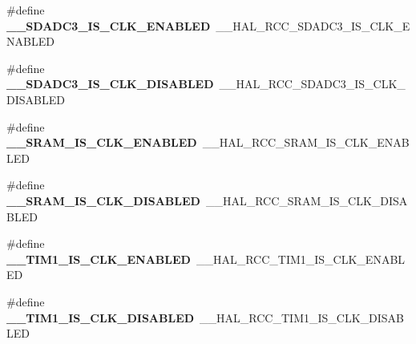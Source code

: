 \begin{DoxyCompactItemize}
\item 
\#define {\bfseries \+\_\+\+\_\+\+S\+D\+A\+D\+C3\+\_\+\+I\+S\+\_\+\+C\+L\+K\+\_\+\+E\+N\+A\+B\+L\+ED}~\+\_\+\+\_\+\+H\+A\+L\+\_\+\+R\+C\+C\+\_\+\+S\+D\+A\+D\+C3\+\_\+\+I\+S\+\_\+\+C\+L\+K\+\_\+\+E\+N\+A\+B\+L\+ED\hypertarget{group___h_a_l___r_c_c___aliased_ga41a9d65373a84607fc66101cb870a848}{}\label{group___h_a_l___r_c_c___aliased_ga41a9d65373a84607fc66101cb870a848}

\item 
\#define {\bfseries \+\_\+\+\_\+\+S\+D\+A\+D\+C3\+\_\+\+I\+S\+\_\+\+C\+L\+K\+\_\+\+D\+I\+S\+A\+B\+L\+ED}~\+\_\+\+\_\+\+H\+A\+L\+\_\+\+R\+C\+C\+\_\+\+S\+D\+A\+D\+C3\+\_\+\+I\+S\+\_\+\+C\+L\+K\+\_\+\+D\+I\+S\+A\+B\+L\+ED\hypertarget{group___h_a_l___r_c_c___aliased_ga730e65c79c630f9fcc26822a8935e5c3}{}\label{group___h_a_l___r_c_c___aliased_ga730e65c79c630f9fcc26822a8935e5c3}

\item 
\#define {\bfseries \+\_\+\+\_\+\+S\+R\+A\+M\+\_\+\+I\+S\+\_\+\+C\+L\+K\+\_\+\+E\+N\+A\+B\+L\+ED}~\+\_\+\+\_\+\+H\+A\+L\+\_\+\+R\+C\+C\+\_\+\+S\+R\+A\+M\+\_\+\+I\+S\+\_\+\+C\+L\+K\+\_\+\+E\+N\+A\+B\+L\+ED\hypertarget{group___h_a_l___r_c_c___aliased_gaa705610d5a659ed552f87a6d6dc8af1a}{}\label{group___h_a_l___r_c_c___aliased_gaa705610d5a659ed552f87a6d6dc8af1a}

\item 
\#define {\bfseries \+\_\+\+\_\+\+S\+R\+A\+M\+\_\+\+I\+S\+\_\+\+C\+L\+K\+\_\+\+D\+I\+S\+A\+B\+L\+ED}~\+\_\+\+\_\+\+H\+A\+L\+\_\+\+R\+C\+C\+\_\+\+S\+R\+A\+M\+\_\+\+I\+S\+\_\+\+C\+L\+K\+\_\+\+D\+I\+S\+A\+B\+L\+ED\hypertarget{group___h_a_l___r_c_c___aliased_ga7b00de661df4e1dc8b36d9e1976b71a4}{}\label{group___h_a_l___r_c_c___aliased_ga7b00de661df4e1dc8b36d9e1976b71a4}

\item 
\#define {\bfseries \+\_\+\+\_\+\+T\+I\+M1\+\_\+\+I\+S\+\_\+\+C\+L\+K\+\_\+\+E\+N\+A\+B\+L\+ED}~\+\_\+\+\_\+\+H\+A\+L\+\_\+\+R\+C\+C\+\_\+\+T\+I\+M1\+\_\+\+I\+S\+\_\+\+C\+L\+K\+\_\+\+E\+N\+A\+B\+L\+ED\hypertarget{group___h_a_l___r_c_c___aliased_ga6f1ed81157e63c93719376c7077e4784}{}\label{group___h_a_l___r_c_c___aliased_ga6f1ed81157e63c93719376c7077e4784}

\item 
\#define {\bfseries \+\_\+\+\_\+\+T\+I\+M1\+\_\+\+I\+S\+\_\+\+C\+L\+K\+\_\+\+D\+I\+S\+A\+B\+L\+ED}~\+\_\+\+\_\+\+H\+A\+L\+\_\+\+R\+C\+C\+\_\+\+T\+I\+M1\+\_\+\+I\+S\+\_\+\+C\+L\+K\+\_\+\+D\+I\+S\+A\+B\+L\+ED\hypertarget{group___h_a_l___r_c_c___aliased_ga0105023c626e29aa2288e6e7d3cc524f}{}\label{group___h_a_l___r_c_c___aliased_ga0105023c626e29aa2288e6e7d3cc524f}


\end{DoxyCompactItemize}
